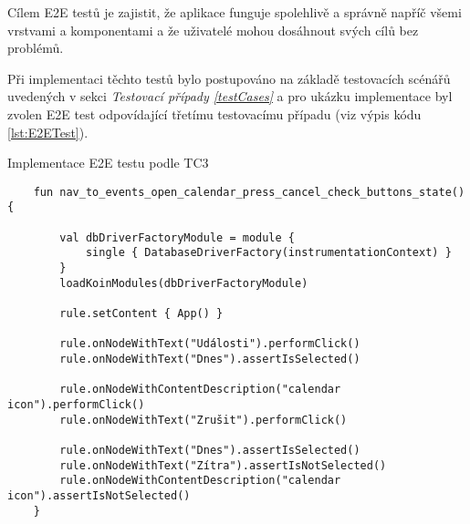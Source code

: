 Cílem E2E testů je zajistit, že aplikace funguje spolehlivě a správně napříč všemi vrstvami a komponentami a že uživatelé mohou dosáhnout 
svých cílů bez problémů.

\bigskip
Při implementaci těchto testů bylo postupováno na základě testovacích scénářů uvedených v sekci \textit{Testovací případy \ref{testCases}} a pro
ukázku implementace byl zvolen E2E test odpovídající třetímu testovacímu případu (viz výpis kódu  \ref{lst:E2ETest}). 

\begin{listing}[H]
  \caption{Implementace E2E testu podle TC3}\label{lst:E2ETest}
  \begin{verbatim}
    fun nav_to_events_open_calendar_press_cancel_check_buttons_state() {

        val dbDriverFactoryModule = module {
            single { DatabaseDriverFactory(instrumentationContext) }
        }
        loadKoinModules(dbDriverFactoryModule)

        rule.setContent { App() }

        rule.onNodeWithText("Události").performClick()
        rule.onNodeWithText("Dnes").assertIsSelected()

        rule.onNodeWithContentDescription("calendar icon").performClick()
        rule.onNodeWithText("Zrušit").performClick()

        rule.onNodeWithText("Dnes").assertIsSelected()
        rule.onNodeWithText("Zítra").assertIsNotSelected()
        rule.onNodeWithContentDescription("calendar icon").assertIsNotSelected()
    }
\end{verbatim}
\end{listing}


